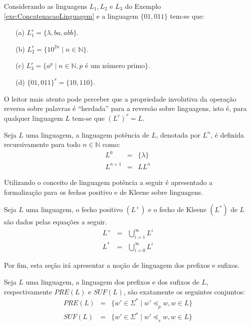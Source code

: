 \begin{example}
	Considerando as linguagens $L_1, L_2$ e $L_3$ do Exemplo \ref{exe:ConcatenacaoLinguagem} e a linguagem $\{01, 011\}$ tem-se que:
	\begin{itemize}
		\item[(a)] $L_1^r = \{\lambda, ba, abb\}$.
		\item[(b)] $L_2^r = \{10^{2n} \mid n \in \mathbb{N}\}$.
		\item[(c)] $L_3^r = \{a^p \mid n \in \mathbb{N}, p \text{ é um número primo}\}$.
		\item[(d)] $\{01, 011\}^r = \{10, 110\}$.
	\end{itemize}
\end{example}

\begin{remark}
	O leitor mais atento pode perceber que a propriedade involutiva da operação reversa sobre palavras é ``herdada'' para a reversão sobre linguagens, isto é, para qualquer linguagem $L$ tem-se que $(L^r)^r = L$. 
\end{remark}

\begin{definition}\label{def:PotenciaLinguagens}
	Seja $L$ uma linguagem, a linguagem potência de $L$, denotada por $L^n$, é definida recursivamente para todo $n \in \mathbb{N}$ como:
	\begin{eqnarray}
		L^0 & = &\{\lambda\}\\
		L^{n+1} & = &  LL^{n}
	\end{eqnarray}
\end{definition}

Utilizando o conceito de linguagem potência a seguir é apresentado a formalização para os fechos positivo e de Kleene sobre linguagens.

\begin{definition}\label{def:FechoPositivoKleeneLinguagem}
	Seja $L$ uma linguagem, o fecho positivo $(L^+)$ e o fecho de Kleene $(L^*)$ de $L$ são dados pelas equações a seguir.
	\begin{eqnarray}
		L^+ & = & \bigcup_{i = 1}^\infty L^i\\
		L^* & = & \bigcup_{i = 0}^\infty L^i
	\end{eqnarray}
\end{definition}

Por fim, esta seção irá apresentar a noção de linguagem dos prefixos e sufixos.

\begin{definition}\label{def:LinguagemPrefixosSufixos}
	Seja $L$ uma linguagem, a linguagem dos prefixos e dos sufixos de $L$, respectivamente $PRE(L)$ e $SUF(L)$, são exatamente os seguintes conjuntos:
	\begin{eqnarray*}
		PRE(L) & = & \{w' \in \Sigma^* \mid w' \preceq_p w, w \in L\}\\
		SUF(L) & = & \{w' \in \Sigma^* \mid w' \preceq_s w, w \in L\}
	\end{eqnarray*}
\end{definition}

